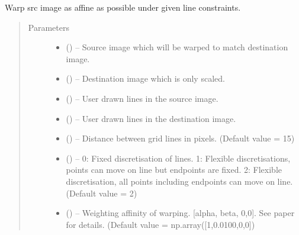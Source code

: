 \documentclass[letterpaper,10pt,english]{sphinxmanual}
\begin{document}
\begin{fulllineitems}
\label{\detokenize{image_aaap_main:image_aaap_main.aaap_morph}}
Warp src image as affine as possible under given line constraints.
\begin{quote}\begin{description}
\item[{Parameters}] \leavevmode\begin{itemize}
\item {} 
 () -- Source image which will be warped to match destination image.

\item {} 
 () -- Destination image which is only scaled.

\item {} 
 () -- User drawn lines in the source image.

\item {} 
 () -- User drawn lines in the destination image.

\item {} 
 () -- Distance between grid lines in pixels. (Default value = 15)

\item {} 
 () -- 0: Fixed discretisation of lines.
1: Flexible discretisations, points can move on line but endpoints
are fixed.
2: Flexible discretisation, all points including endpoints can move
on line. (Default value = 2)

\item {} 
 () -- Weighting affinity of warping.
{[}alpha, beta, 0,0{]}. See paper for details.
(Default value = np.array({[}1,0.0100,0,0{]})


\end{itemize}
\end{description}
\end{quote}
\end{fulllineitems}
\end{document}

